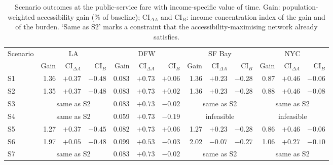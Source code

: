 \begin{table}[!htbp]
\centering
\caption{Scenario outcomes at the public-service fare with income-specific value of time. Gain: population-weighted accessibility gain (\% of baseline); CI$_{\Delta A}$ and CI$_{B}$: income concentration index of the gain and of the burden. `Same as S2' marks a constraint that the accessibility-maximising network already satisfies.}
\label{tab:scenarios}
\footnotesize\setlength{\tabcolsep}{3.5pt}
\begin{tabular}{lrrrrrrrrrrrr}
\toprule
Scenario & \multicolumn{3}{c}{LA} & \multicolumn{3}{c}{DFW} & \multicolumn{3}{c}{SF Bay} & \multicolumn{3}{c}{NYC} \\
\cmidrule(lr){2-4} \cmidrule(lr){5-7} \cmidrule(lr){8-10} \cmidrule(lr){11-13}
 & Gain & CI$_{\Delta A}$ & CI$_{B}$ & Gain & CI$_{\Delta A}$ & CI$_{B}$ & Gain & CI$_{\Delta A}$ & CI$_{B}$ & Gain & CI$_{\Delta A}$ & CI$_{B}$ \\
\midrule
S1 & 1.36 & $+0.37$ & $-0.48$ & 0.083 & $+0.73$ & $+0.06$ & 1.36 & $+0.23$ & $-0.28$ & 0.87 & $+0.46$ & $-0.06$ \\
S2 & 1.35 & $+0.37$ & $-0.48$ & 0.083 & $+0.73$ & $+0.02$ & 1.36 & $+0.23$ & $-0.28$ & 0.88 & $+0.46$ & $-0.08$ \\
S3 & \multicolumn{3}{c}{same as S2} & 0.083 & $+0.73$ & $-0.02$ & \multicolumn{3}{c}{same as S2} & \multicolumn{3}{c}{same as S2} \\
S4 & \multicolumn{3}{c}{same as S2} & 0.059 & $+0.73$ & $-0.19$ & \multicolumn{3}{c}{infeasible} & \multicolumn{3}{c}{infeasible} \\
S5 & 1.27 & $+0.37$ & $-0.45$ & 0.082 & $+0.73$ & $+0.06$ & 1.27 & $+0.23$ & $-0.28$ & 0.86 & $+0.46$ & $-0.06$ \\
S6 & 1.97 & $+0.05$ & $-0.48$ & 0.099 & $+0.53$ & $-0.03$ & 2.02 & $-0.07$ & $-0.27$ & 1.06 & $+0.27$ & $-0.10$ \\
S7 & \multicolumn{3}{c}{same as S2} & 0.083 & $+0.73$ & $-0.02$ & \multicolumn{3}{c}{same as S2} & \multicolumn{3}{c}{same as S2} \\
\bottomrule
\end{tabular}
\end{table}
